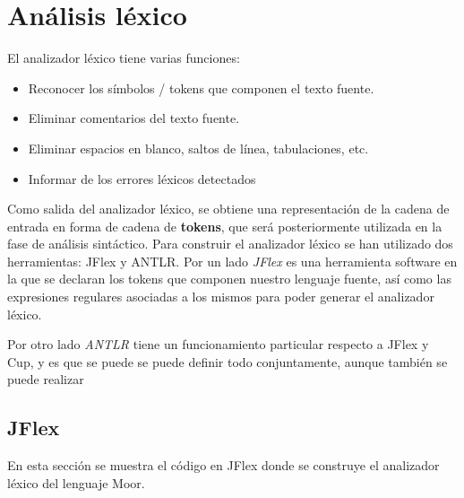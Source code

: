 \documentclass[12pt,a4paper]{article}
\begin{document}
	\clearpage

\section{Análisis léxico}
El analizador léxico tiene varias funciones:
\begin{itemize}
	\item Reconocer los símbolos / tokens que componen el texto fuente.
	\item Eliminar comentarios del texto fuente.
	\item Eliminar espacios en blanco, saltos de línea, tabulaciones, etc.
	\item Informar de los errores léxicos detectados
\end{itemize}

Como salida del analizador léxico, se obtiene una representación de la cadena de entrada en forma de cadena de \textbf{tokens}, que será posteriormente utilizada en la fase de análisis sintáctico. Para construir el analizador léxico se han utilizado dos herramientas: JFlex y ANTLR. 
\newline
\newline
Por un lado \textit{JFlex} es una herramienta software en la que se declaran los tokens que componen nuestro lenguaje fuente, así como las expresiones regulares asociadas a los mismos para poder generar el analizador léxico. \newline

Por otro lado \textit{ANTLR} tiene un funcionamiento particular respecto a JFlex y Cup, y es que se puede se puede definir todo conjuntamente, aunque también se puede realizar

\subsection{JFlex}

En esta sección se muestra el código en JFlex donde se construye el analizador léxico del lenguaje Moor.
\end{document}

